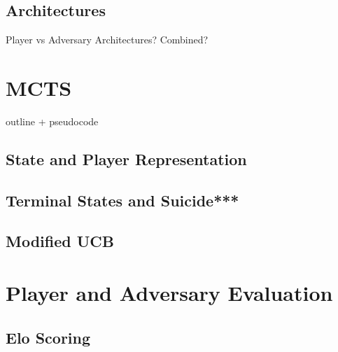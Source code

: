 \documentclass[main.tex]{subfiles}
\begin{document}
\subsection{Architectures}
Player vs Adversary Architectures? Combined?

\section{MCTS}
outline + pseudocode
\subsection{State and Player Representation}

\subsection{Terminal States and Suicide***}

\subsection{Modified UCB}


\section{Player and Adversary Evaluation}
\subsection{Elo Scoring}
\end{document}
